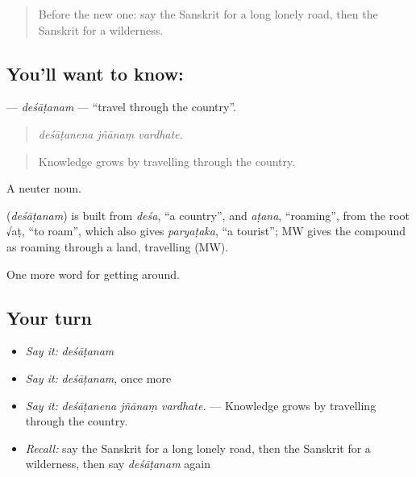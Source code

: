 \label{lesson:SA-C404-desatanam}



\begin{quote}
Before the new one: say the Sanskrit for a long lonely road, then the Sanskrit for a wilderness.
\end{quote}

\subsection*{You'll want to know: }
\textbf{} — \emph{deśāṭanam} — \textquotedblleft{}travel through the country\textquotedblright{}.

\begin{quote}
  
\end{quote}

\begin{quote}
\emph{deśāṭanena jñānaṃ vardhate.}
\end{quote}

\begin{quote}
Knowledge grows by travelling through the country.
\end{quote}

A neuter noun.

\begin{cousinweb}
\textbf{} (\emph{deśāṭanam}) is built from \emph{deśa}, \textquotedblleft{}a country\textquotedblright{}, and \emph{aṭana}, \textquotedblleft{}roaming\textquotedblright{}, from the root √aṭ, \textquotedblleft{}to roam\textquotedblright{}, which also gives \emph{paryaṭaka}, \textquotedblleft{}a tourist\textquotedblright{}; MW gives the compound as roaming through a land, travelling (MW).
\end{cousinweb}

\begin{grammarlens}[title={What you've built}]
One more word for getting around.
\end{grammarlens}

\subsection*{Your turn}
\begin{itemize}
\raggedright
  \item \emph{Say it:} \emph{deśāṭanam}
  \item \emph{Say it:} \emph{deśāṭanam}, once more
  \item \emph{Say it:} \emph{deśāṭanena jñānaṃ vardhate.} — Knowledge grows by travelling through the country.
  \item \emph{Recall:} say the Sanskrit for a long lonely road, then the Sanskrit for a wilderness, then say \emph{deśāṭanam} again
\end{itemize}

